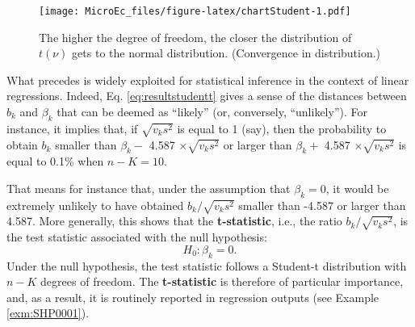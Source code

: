 \documentclass[
  12pt,
]{book}
\theoremstyle{definition}
\theoremstyle{definition}
\theoremstyle{definition}
\theoremstyle{definition}
\theoremstyle{remark}
\begin{document}
\begin{figure}
\centering
\texttt{[image: MicroEc\_files/figure-latex/chartStudent-1.pdf]}
\caption{\label{fig:chartStudent}The higher the degree of freedom, the closer the distribution of \(t(\nu)\) gets to the normal distribution. (Convergence in distribution.)}
\end{figure}

What precedes is widely exploited for statistical inference in the context of linear regressions. Indeed, Eq. \eqref{eq:resultstudentt} gives a sense of the distances between \(b_k\) and \(\beta_k\) that can be deemed as ``likely'' (or, conversely, ``unlikely''). For instance, it implies that, if \(\sqrt{v_k s^2}\) is equal to 1 (say), then the probability to obtain \(b_k\) smaller than \(\beta_k-\) 4.587 \(\times \sqrt{v_k s^2}\) or larger than \(\beta_k+\) 4.587 \(\times \sqrt{v_k s^2}\) is equal to 0.1\% when \(n-K=10\).

That means for instance that, under the assumption that \(\beta_k=0\), it would be extremely unlikely to have obtained \(b_k/\sqrt{v_k s^2}\) smaller than -4.587 or larger than 4.587. More generally, this shows that the \textbf{t-statistic}, i.e., the ratio \(b_k/\sqrt{v_k s^2}\), is the test statistic associated with the null hypothesis:
\[
H_0: \beta_k=0.
\]
Under the null hypothesis, the test statistic follows a Student-t distribution with \(n-K\) degrees of freedom. The \textbf{t-statistic} is therefore of particular importance, and, as a result, it is routinely reported in regression outputs (see Example \ref{exm:SHP0001}).
\end{document}
